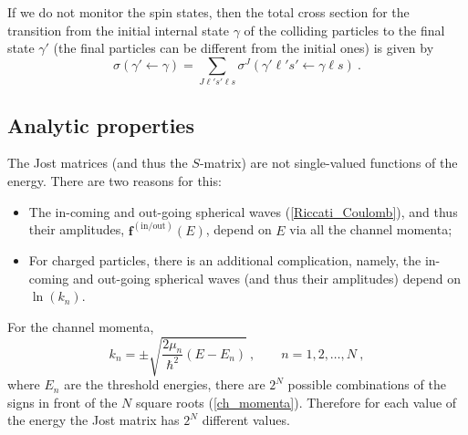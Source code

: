 \documentclass[12pt]{article}
\begin{document}
If we do not monitor the spin states, then the total cross section for the
transition from the initial internal state $\gamma$ of the colliding particles
to the final state $\gamma'$ (the final particles can be different from the
initial ones) is given by
\begin{equation}
\label{multichannel.sigma.etaprimeeta}
   \sigma(\gamma'\gets\gamma)=
   \sum_{J\ell's'\ell s}\sigma^J(\gamma'\ell's'\gets\gamma\ell s)\ .
\end{equation}


\subsection{Analytic properties}
The Jost matrices (and thus the $S$-matrix) are not single-valued functions of
the energy. There are two reasons for this:
\begin{itemize}
\item
The in-coming and out-going spherical waves (\ref{Riccati_Coulomb}), and thus
their amplitudes, $\bm{f}^{\mathrm{(in/out)}}(E)$, depend on $E$ via all the channel
momenta;
\item
For charged particles, there is an additional complication, namely, the
in-coming and out-going spherical waves (and thus their amplitudes) depend on
$\ln(k_n)$.
\end{itemize}
For the channel momenta,
\begin{equation}
\label{ch_momenta}
   k_n=\pm\sqrt{\frac{2\mu_n}{\hbar^2}(E-E_n)}\ ,
   \qquad  n=1,2,\dots,N\ ,
\end{equation}
where $E_n$ are the threshold energies, there are $2^N$ possible
combinations of the signs in front of the $N$ square roots (\ref{ch_momenta}).
Therefore for each value of the energy the Jost matrix has $2^N$ different
values. 
\end{document}
